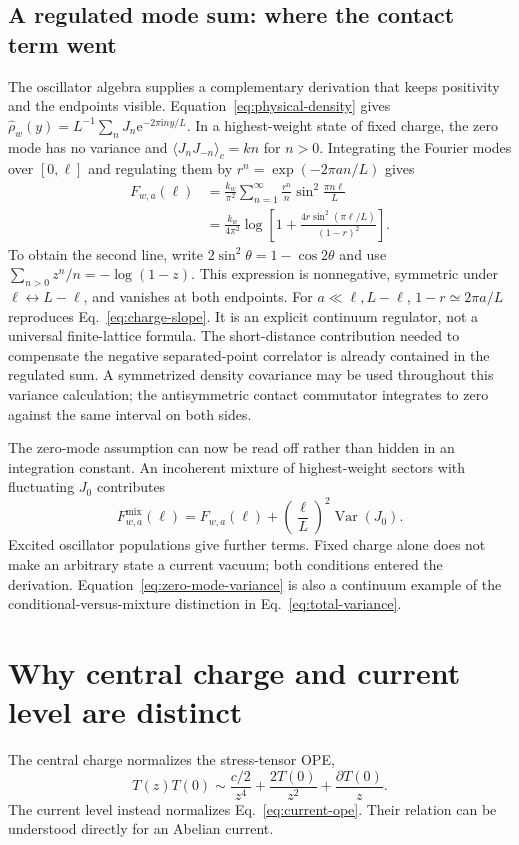 \documentclass[aps,prb,onecolumn,nofootinbib,superscriptaddress]{revtex4-2}
\newcommand{\ii}{\mathrm{i}}
\newcommand{\e}{\mathrm{e}}
\newcommand{\Var}{\operatorname{Var}}
\begin{document}
\subsection{A regulated mode sum: where the contact term went}
The oscillator algebra supplies a complementary derivation that keeps
positivity and the endpoints visible. Equation~\eqref{eq:physical-density}
gives $\hat\rho_w(y)=L^{-1}\sum_nJ_n\e^{-2\pi\ii ny/L}$.
In a highest-weight state of fixed charge, the zero mode has no variance
and $\langle J_nJ_{-n}\rangle_c=kn$ for $n>0$. Integrating the Fourier
modes over $[0,\ell]$ and regulating them by
$r^n=\exp(-2\pi a n/L)$ gives
\begin{align}
 F_{w,a}(\ell)
 &=\frac{k_w}{\pi^2}\sum_{n=1}^\infty
             \frac{r^n}{n}\sin^2\frac{\pi n\ell}{L}\nonumber\\
 &=\frac{k_w}{4\pi^2}
       \log\left[1+\frac{4r\sin^2(\pi\ell/L)}{(1-r)^2}\right].
 \label{eq:regulated-current-sum}
\end{align}
To obtain the second line, write $2\sin^2\theta=1-\cos2\theta$ and
use $\sum_{n>0}z^n/n=-\log(1-z)$. This expression is nonnegative,
symmetric under $\ell\leftrightarrow L-\ell$, and vanishes at both
endpoints. For $a\ll\ell,L-\ell$, $1-r\simeq2\pi a/L$ reproduces
Eq.~\eqref{eq:charge-slope}. It is an explicit continuum regulator, not
a universal finite-lattice formula. The short-distance contribution
needed to compensate the negative separated-point correlator is already
contained in the regulated sum. A symmetrized density covariance may be
used throughout this variance calculation; the antisymmetric contact
commutator integrates to zero against the same interval on both sides.

The zero-mode assumption can now be read off rather than hidden in an
integration constant. An incoherent mixture of highest-weight sectors
with fluctuating $J_0$ contributes
\begin{equation}
 F_{w,a}^{\mathrm{mix}}(\ell)
 =F_{w,a}(\ell)+\left(\frac{\ell}{L}\right)^2\Var(J_0).
 \label{eq:zero-mode-variance}
\end{equation}
Excited oscillator populations give further terms. Fixed charge alone
does not make an arbitrary state a current vacuum; both conditions entered
the derivation. Equation~\eqref{eq:zero-mode-variance} is also a continuum
example of the conditional-versus-mixture distinction in
Eq.~\eqref{eq:total-variance}.

\section{Why central charge and current level are distinct}
\label{sec:sugawara}
The central charge normalizes the stress-tensor OPE,
\begin{equation}
 T(z)T(0)\sim\frac{c/2}{z^4}
          +\frac{2T(0)}{z^2}+\frac{\partial T(0)}{z}.
 \label{eq:stress-ope}
\end{equation}
The current level instead normalizes Eq.~\eqref{eq:current-ope}.
Their relation can be understood directly for an Abelian current.
\end{document}
